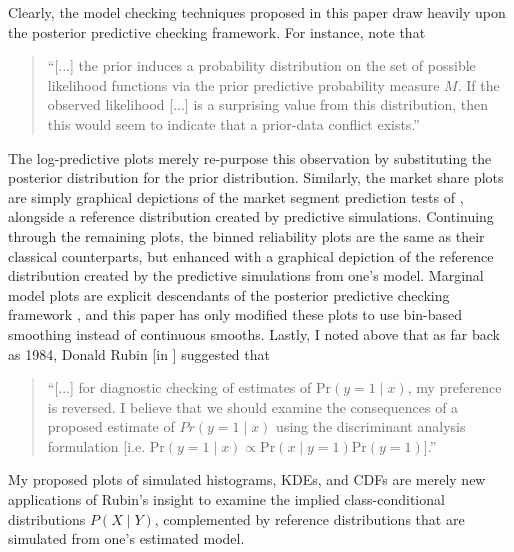 \documentclass[preprint]{elsarticle}
\begin{document}
Clearly, the model checking techniques proposed in this paper draw heavily upon the posterior predictive checking framework. For instance, \citet[p. 896]{evans_checking_2006} note that
\begin{quote}
``[...] the prior induces a probability distribution on the set of possible likelihood functions via the prior predictive probability measure $M$. If the observed likelihood [...] is a surprising value from this distribution, then this would seem to indicate that a prior-data conflict exists.''
\end{quote}
The log-predictive plots merely re-purpose this observation by substituting the posterior distribution for the prior distribution. Similarly, the market share plots are simply graphical depictions of the market segment prediction tests of \citet[Section 7.6]{ben-akiva_discrete_1985}, alongside a reference distribution created by predictive simulations. Continuing through the remaining plots, the binned reliability plots are the same as their classical counterparts, but enhanced with a graphical depiction of the reference distribution created by the predictive simulations from one's model. Marginal model plots are explicit descendants of the posterior predictive checking framework \citep[pp.266-267]{pardoe_2002_graphical}, and this paper has only modified these plots to use bin-based smoothing instead of continuous smooths. Lastly, I noted above that as far back as 1984, Donald Rubin [in \citet[pp. 79-80]{landwehr_graphical_1984}] suggested that
\begin{quote}
``[...] for diagnostic checking of estimates of $\textrm{Pr} \left( y = 1 \mid x \right)$, my preference is reversed. I believe that we should examine the consequences of a proposed estimate of $Pr \left( y = 1 \mid x \right)$ using the discriminant analysis formulation [i.e. $\textrm{Pr} \left( y = 1 \mid x \right) \propto \textrm{Pr} \left( x \mid y = 1  \right) \textrm{Pr} \left( y = 1 \right)$].''
\end{quote}
My proposed plots of simulated histograms, KDEs, and CDFs are merely new applications of Rubin's insight to examine the implied class-conditional distributions $P \left( X \mid Y \right)$, complemented by reference distributions that are simulated from one's estimated model.
\end{document}

